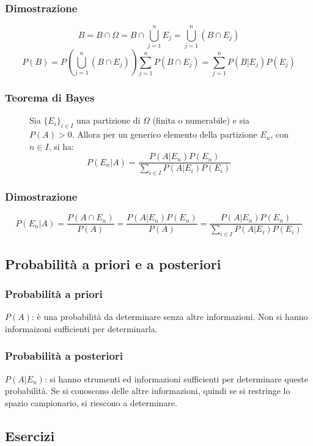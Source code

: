 \documentclass[a4paper]{article}
\theoremstyle{break}
\theoremstyle{break}
\theoremstyle{break}
\theoremstyle{break}
\begin{document}
\subsubsection{Dimostrazione}
\[
  B = B \cap \Omega = B \cap \bigcup_{j=1}^n E_j = \bigcup_{j=1}^n (B \cap E_j)
\] 
\[
  P(B) = P\left( \bigcup_{j=1}^n (B \cap E_j) \right) \sum_{j=1}^n P(B \cap E_j) =
  \sum_{j=1}^n P(B|E_j)P(E_j)
\] 

\subsubsection{Teorema di Bayes}
\begin{figure}[H]
  \begin{definition}
    Sia \( \{E_i\}_{i \in I}  \) una partizione di \( \Omega \) (finita o numerabile) e sia
    \( P(A) > 0 \). Allora per un generico elemento della partizione \( E_n \), con
    \( n \in I \), si ha:
    \[
      P(E_n|A) = \frac{P(A|E_n)P(E_n)}{\sum_{i \in I} P(A|E_i)P(E_i)}
    \] 
  \end{definition}
\end{figure}
\subsubsection{Dimostrazione}
\[
  P(E_n|A) = \frac{P(A \cap E_n)}{P(A)} = \frac{P(A|E_n)P(E_n)}{P(A)} = \frac{P(A|E_n)P(E_n)}{
  \sum_{i \in I} P(A|E_i)P(E_i)}
\] 

\subsection{Probabilità a priori e a posteriori}
\subsubsection{Probabilità a priori}
\( P(A) \): è una probabilità da determinare senza altre informazioni. Non si hanno
informaizoni sufficienti per determinarla.

\subsubsection{Probabilità a posteriori}
\( P(A|E_n) \): si hanno strumenti ed informazioni sufficienti per determinare queste
probabilità. Se si conoscono delle altre informazioni, quindi se si restringe lo spazio
campionario, si riescono a determinare.

\subsection{Esercizi}
\end{document}
